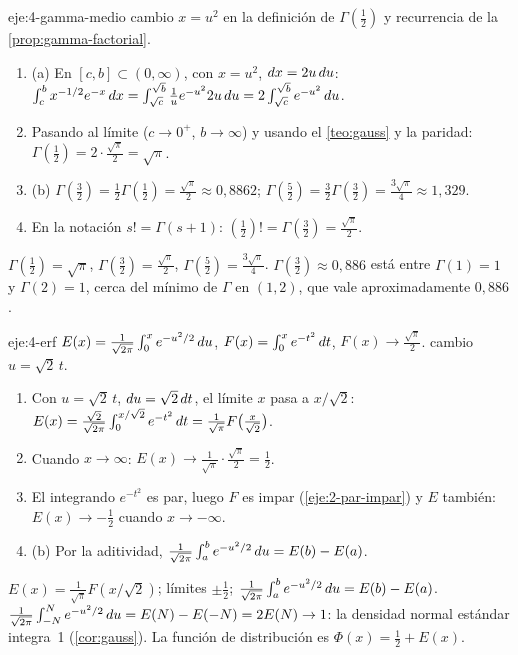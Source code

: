 \begin{solucion}{eje:4-gamma-medio}
\planteamiento cambio $x=u^{2}$ en la definición de $\Gamma(\frac12)$ y recurrencia de la \cref{prop:gamma-factorial}.
\pasos
\begin{enumerate}[label=\arabic*.]
  \item (a) En $[c,b]\subset(0,\infty)$, con $x=u^{2}$, $\mathop{}\!d x=2u\mathop{}\!d u$: $\int_c^{b}x^{-1/2}e^{-x}\mathop{}\!d x=\int_{\sqrt c}^{\sqrt b}\frac1ue^{-u^{2}}2u\mathop{}\!d u=2\int_{\sqrt c}^{\sqrt b}e^{-u^{2}}\mathop{}\!d u$.
  \item Pasando al límite ($c\to0^{+}$, $b\to\infty$) y usando el \cref{teo:gauss} y la paridad: $\Gamma(\frac12)=2\cdot\frac{\sqrt\pi}{2}=\sqrt\pi$.
  \item (b) $\Gamma(\frac32)=\frac12\Gamma(\frac12)=\frac{\sqrt\pi}{2}\approx0{,}8862$; $\Gamma(\frac52)=\frac32\Gamma(\frac32)=\frac{3\sqrt\pi}{4}\approx1{,}329$.
  \item En la notación $s!=\Gamma(s+1)$: $(\frac12)!=\Gamma(\frac32)=\frac{\sqrt\pi}{2}$.
\end{enumerate}
\resultado $\Gamma(\frac12)=\sqrt\pi$, $\Gamma(\frac32)=\frac{\sqrt\pi}{2}$, $\Gamma(\frac52)=\frac{3\sqrt\pi}{4}$.
\comprobacion $\Gamma(\frac32)\approx0{,}886$ está entre $\Gamma(1)=1$ y $\Gamma(2)=1$, cerca del mínimo de $\Gamma$ en $(1,2)$, que vale aproximadamente $0{,}886$.
\end{solucion}

\begin{solucion}{eje:4-erf}
\datos $E(x)=\frac{1}{\sqrt{2\pi}}\int_0^{x}e^{-u^{2}/2}\mathop{}\!d u$, $F(x)=\int_0^{x}e^{-t^{2}}\mathop{}\!d t$, $F(x)\to\frac{\sqrt\pi}{2}$.
\planteamiento cambio $u=\sqrt2\,t$.
\pasos
\begin{enumerate}[label=\arabic*.]
  \item Con $u=\sqrt2\,t$, $\mathop{}\!d u=\sqrt2\mathop{}\!d t$, el límite $x$ pasa a $x/\sqrt2$: $E(x)=\frac{\sqrt2}{\sqrt{2\pi}}\int_0^{x/\sqrt2}e^{-t^{2}}\mathop{}\!d t=\frac{1}{\sqrt\pi}F\bigl(\tfrac{x}{\sqrt2}\bigr)$.
  \item Cuando $x\to\infty$: $E(x)\to\frac{1}{\sqrt\pi}\cdot\frac{\sqrt\pi}{2}=\frac12$.
  \item El integrando $e^{-t^{2}}$ es par, luego $F$ es impar (\cref{eje:2-par-impar}) y $E$ también: $E(x)\to-\frac12$ cuando $x\to-\infty$.
  \item (b) Por la aditividad, $\frac{1}{\sqrt{2\pi}}\int_a^{b}e^{-u^{2}/2}\mathop{}\!d u=E(b)-E(a)$.
\end{enumerate}
\resultado $E(x)=\frac{1}{\sqrt\pi}F(x/\sqrt2)$; límites $\pm\frac12$; $\frac{1}{\sqrt{2\pi}}\int_a^{b}e^{-u^{2}/2}\mathop{}\!d u=E(b)-E(a)$.
\comprobacion $\frac{1}{\sqrt{2\pi}}\int_{-N}^{N}e^{-u^{2}/2}\mathop{}\!d u=E(N)-E(-N)=2E(N)\to1$: la densidad normal estándar integra~1 (\cref{cor:gauss}). La función de distribución es $\Phi(x)=\frac12+E(x)$.
\end{solucion}

